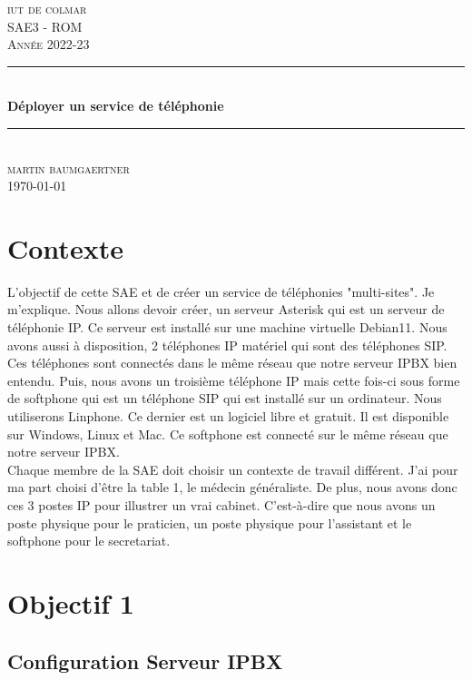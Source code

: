 \documentclass[12pt, a4paper]{article}
\begin{document}
\begin{titlepage}
	\newcommand{\HRule}{\rule{\linewidth}{0.5mm}} 
	\center 
	\textsc{\LARGE iut de colmar}\\[6.5cm] 
	\textsc{\Large SAE3 - ROM}\\[0.5cm] 
	\textsc{\large Année 2022-23}\\[0.5cm]
	\HRule\\[0.75cm]
	{\huge\bfseries Déployer un service de téléphonie}\\[0.4cm]
	\HRule\\[1.5cm]
	\textsc{\large martin baumgaertner}\\[6.5cm] 

	\vfill\vfill\vfill
	{\large\today} 
	\vfill
\end{titlepage}
\newpage
\tableofcontents
\newpage
\section*{Contexte}
L'objectif de cette SAE et de créer un service de téléphonies "multi-sites". Je
m'explique. Nous allons devoir créer, un serveur Asterisk qui est un serveur de
téléphonie IP. Ce serveur est installé sur une machine virtuelle Debian11. Nous
avons aussi à disposition, 2 téléphones IP matériel qui sont des téléphones SIP. Ces
téléphones sont connectés dans le même réseau que notre serveur IPBX bien entendu. 
Puis, nous avons un troisième téléphone IP mais cette fois-ci sous forme de softphone
qui est un téléphone SIP qui est installé sur un ordinateur. Nous utiliserons 
Linphone. Ce dernier est un logiciel libre et gratuit. Il est disponible sur
Windows, Linux et Mac. Ce softphone est connecté sur le même réseau que notre serveur
IPBX.\\

Chaque membre de la SAE doit choisir un contexte de travail différent. J'ai pour
ma part choisi d'être la table 1, le médecin généraliste. De plus, nous 
avons donc ces 3 postes IP pour illustrer un vrai cabinet. C'est-à-dire que nous
avons un poste physique pour le praticien, un poste physique pour l'assistant et
le softphone pour le secretariat.\\

\section{Objectif 1}
\subsection{Configuration Serveur IPBX}
\end{document}
